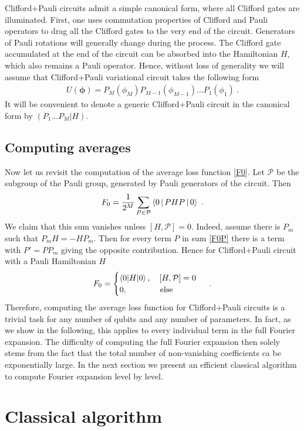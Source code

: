\documentclass[twocolumn, amsfonts, amssymb, aps, nofootinbib]{revtex4-2}
\newcommand{\CP}{Clifford+Pauli}
\begin{document}
\CP{} circuits admit a simple canonical form, where all Clifford gates are illuminated. First, one uses commutation properties of Clifford and Pauli operators to drag all the Clifford gates to the very end of the circuit. Generators of Pauli rotations will generally change during the process. The Clifford gate accumulated at the end of the circuit can be absorbed into the Hamiltonian $H$, which also remains a Pauli operator. Hence, without loss of generality we will assume that \CP{} variational circuit takes the following form
\begin{align}
	U(\pmb\phi)=P_M(\phi_M)P_{M-1}(\phi_{M-1})\dots P_1(\phi_1) \ .
\end{align}
It will be convenient to denote a generic \CP{} circuit in the canonical form by $(P_1\dots P_M|H)$.

\subsection{Computing averages}
Now let us revisit the computation of the average loss function \eqref{F0}. Let $\mathcal{P}$ be the subgroup of the Pauli group, generated by Pauli generators of the circuit. Then
\begin{align}
	F_0=\frac{1}{2^M}\sum_{P\in \mathcal{P}}\Braket{0|PHP|0} \ . \label{F0P}
\end{align}
We claim that this sum vanishes unless $[H, \mathcal{P}]=0$. Indeed, assume there is $P_m$ such that $P_mH=-HP_m$. Then for every term $P$ in sum \eqref{F0P} there is a term with $P'=PP_m$ giving the opposite contribution. Hence for \CP{} circuit with a Pauli Hamiltonian $H$
\begin{align}
	F_0=\begin{cases} \braket{0|H|0},\quad [H, \mathcal{P}] = 0\\ 0,\qquad\qquad \text{else}\end{cases} \ .
\end{align}
Therefore, computing the average loss function for \CP{} circuits is a trivial task for any number of qubits and any number of parameters. In fact, as we show in the following, this applies to every individual term in the full Fourier expansion. The difficulty of computing the full Fourier expansion then solely stems from the fact that the total number of non-vanishing coefficients ca be exponentially large. In the next section we present an efficient classical algorithm to compute Fourier expansion level by level.
\section{Classical algorithm}
\end{document}
